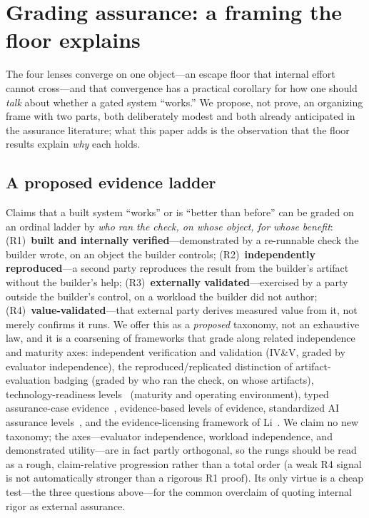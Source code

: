 \documentclass[11pt]{article}
\theoremstyle{definition}
\theoremstyle{remark}
\begin{document}
\section{Grading assurance: a framing the floor explains}\label{sec:assurance}
The four lenses converge on one object---an escape floor that internal effort cannot cross---and that
convergence has a practical corollary for how one should \emph{talk} about whether a gated system
``works.'' We propose, not prove, an organizing frame with two parts, both deliberately modest and both
already anticipated in the assurance literature; what this paper adds is the observation that the floor
results explain \emph{why} each holds.

\subsection{A proposed evidence ladder}
Claims that a built system ``works'' or is ``better than before'' can be graded on an ordinal ladder by
\emph{who ran the check, on whose object, for whose benefit}: (R1)~\textbf{built and internally
verified}---demonstrated by a re-runnable check the builder wrote, on an object the builder controls;
(R2)~\textbf{independently reproduced}---a second party reproduces the result from the builder's
artifact without the builder's help; (R3)~\textbf{externally validated}---exercised by a party outside
the builder's control, on a workload the builder did not author; (R4)~\textbf{value-validated}---that
external party derives measured value from it, not merely confirms it runs. We offer this as a
\emph{proposed} taxonomy, not an exhaustive law, and it is a coarsening of frameworks that grade along
related independence and maturity axes: independent verification and validation (IV\&V, graded by
evaluator independence), the reproduced/replicated distinction of artifact-evaluation badging (graded by
who ran the check, on whose artifacts), technology-readiness levels~\cite{mankins1995} (maturity and
operating environment), typed assurance-case evidence~\cite{gsn}, evidence-based levels of evidence,
standardized AI assurance
levels~\cite{aal2026}, and the evidence-licensing framework of Li~\cite{li2026}. We claim no new
taxonomy; the axes---evaluator independence, workload independence, and demonstrated utility---are in
fact partly orthogonal, so the rungs should be read as a rough, claim-relative progression rather than
a total order (a weak R4 signal is not automatically stronger than a rigorous R1 proof). Its only
virtue is a cheap test---the three questions above---for the common overclaim of quoting internal rigor
as external assurance.
\end{document}
